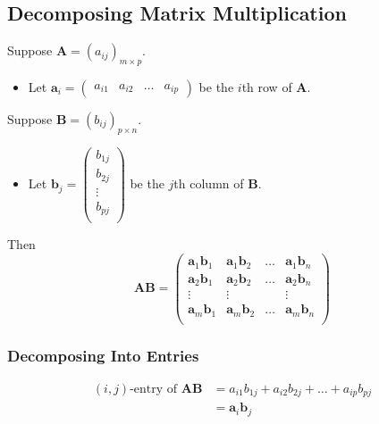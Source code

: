 \documentclass[../ma2001_notes.tex]{subfiles}
\begin{document}
\subsection{Decomposing Matrix Multiplication}
Suppose \(\bm{A}=(a_{ij})_{m\times p}\).
\begin{itemize}
	\item Let \(\bm{a}_i=\left(\begin{array}{cccc}
		a_{i1} & a_{i2} & \ldots & a_{ip}
	\end{array}\right)\) be the \(i\)th row of \(\bm{A}\).
\end{itemize}
Suppose \(\bm{B}=(b_{ij})_{p\times n}\).
\begin{itemize}
	\item Let \(\bm{b}_j=\left(\begin{array}{c}
		b_{1j} \\
		b_{2j} \\
		\vdots \\
		b_{pj} \\
	\end{array}\right)\) be the \(j\)th column of \(\bm{B}\).
\end{itemize}
Then
\[\bm{AB}=\left(\begin{array}{cccc}
	\bm{a}_1\bm{b}_1 & \bm{a}_1\bm{b}_2 & \ldots & \bm{a}_1\bm{b}_n \\
	\bm{a}_2\bm{b}_1 & \bm{a}_2\bm{b}_2 & \ldots & \bm{a}_2\bm{b}_n \\
	\vdots & \vdots & & \vdots \\
	\bm{a}_m\bm{b}_1 & \bm{a}_m\bm{b}_2 & \ldots & \bm{a}_m\bm{b}_n \\
\end{array}\right)\]

\subsubsection{Decomposing Into Entries}
\begin{align*}
	(i,j)\text{-entry of }\bm{AB}
	&=a_{i1}b_{1j}+a_{i2}b_{2j}+\ldots+a_{ip}b_{pj} \\
	&=\bm{a}_i\bm{b}_j
\end{align*}
\end{document}
